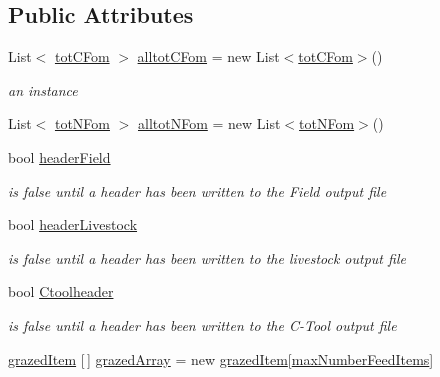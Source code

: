 \subsection*{Public Attributes}
\begin{DoxyCompactItemize}
\item 
List$<$ \mbox{\hyperlink{struct_global_vars_1_1tot_c_fom}{tot\+C\+Fom}} $>$ \mbox{\hyperlink{class_global_vars_a8053b09fd5b316711e87abb39ef0e07c}{alltot\+C\+Fom}} = new List$<$\mbox{\hyperlink{struct_global_vars_1_1tot_c_fom}{tot\+C\+Fom}}$>$()
\begin{DoxyCompactList}\small\item\em an instance \end{DoxyCompactList}\item 
List$<$ \mbox{\hyperlink{struct_global_vars_1_1tot_n_fom}{tot\+N\+Fom}} $>$ \mbox{\hyperlink{class_global_vars_a2572f02893208587743e907ff7662914}{alltot\+N\+Fom}} = new List$<$\mbox{\hyperlink{struct_global_vars_1_1tot_n_fom}{tot\+N\+Fom}}$>$()
\item 
bool \mbox{\hyperlink{class_global_vars_a2e743041f1f7c995cc92ce90dced2822}{header\+Field}}
\begin{DoxyCompactList}\small\item\em is false until a header has been written to the Field output file \end{DoxyCompactList}\item 
bool \mbox{\hyperlink{class_global_vars_a13f0621b9ef546909f40ca12eb999c78}{header\+Livestock}}
\begin{DoxyCompactList}\small\item\em is false until a header has been written to the livestock output file \end{DoxyCompactList}\item 
bool \mbox{\hyperlink{class_global_vars_a0b8860093c80385ce3a6d8c590f3023c}{Ctoolheader}}
\begin{DoxyCompactList}\small\item\em is false until a header has been written to the C-\/\+Tool output file \end{DoxyCompactList}\item 
\mbox{\hyperlink{struct_global_vars_1_1grazed_item}{grazed\+Item}} \mbox{[}$\,$\mbox{]} \mbox{\hyperlink{class_global_vars_a72d7a0bc05f7dd554854b67127849e5b}{grazed\+Array}} = new \mbox{\hyperlink{struct_global_vars_1_1grazed_item}{grazed\+Item}}\mbox{[}\mbox{\hyperlink{class_global_vars_a42fa58d4be2a863e36b4ec8e8bee69cd}{max\+Number\+Feed\+Items}}\mbox{]}

\end{DoxyCompactItemize}

